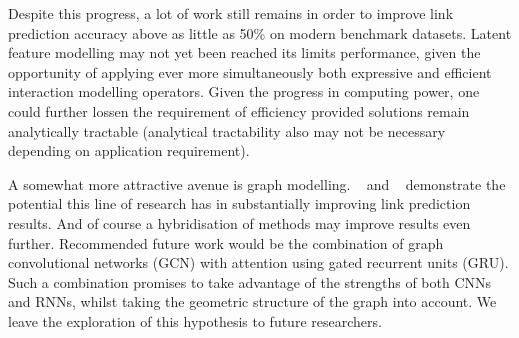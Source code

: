 \noindent Despite this progress, a lot of work still remains in order to improve link prediction accuracy above as little as 50\% on modern benchmark datasets. Latent feature modelling may not yet been reached its limits performance, given the opportunity of applying ever more simultaneously both expressive and efficient interaction modelling operators. Given the progress in computing power, one could further lossen the requirement of efficiency provided solutions remain analytically tractable (analytical tractability also may not be necessary depending on application requirement).\par

\noindent A somewhat more attractive avenue is graph modelling.  ~\citep{nathani2019learning} and ~\citep{pinter-eisenstein-2018-predicting} demonstrate the potential this line of research has in substantially improving link prediction results. And of course a hybridisation of methods may improve results even further. Recommended future work would be the combination of graph convolutional networks (GCN) with attention using gated recurrent units (GRU). Such a combination promises to take advantage of the strengths of both CNNs and RNNs, whilst taking the geometric structure of the graph into account. We leave the exploration of this hypothesis to future researchers.
